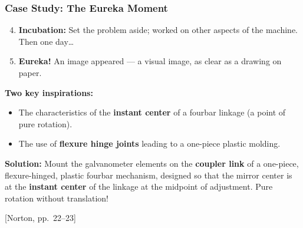 \documentclass[10pt,aspectratio=43]{beamer}
\newcommand{\pref}[1]{\vfill\hfill{\scriptsize\color{gray}[Norton, pp.~#1]}}
\begin{document}
\begin{frame}
\frametitle{Case Study: The Eureka Moment}

\begin{enumerate}
  \setcounter{enumi}{3}
  \item \textbf{Incubation:} Set the problem aside; worked on other aspects of the machine. Then one day\ldots
  \item \textbf{Eureka!} An image appeared --- a visual image, as clear as a drawing on paper.
\end{enumerate}

\vspace{4pt}
\textbf{Two key inspirations:}
\begin{itemize}
  \item The characteristics of the \textbf{instant center} of a fourbar linkage (a point of pure rotation).
  \item The use of \textbf{flexure hinge joints} leading to a one-piece plastic molding.
\end{itemize}

\vspace{6pt}
\begin{yellowbox}
\textbf{Solution:} Mount the galvanometer elements on the \textbf{coupler link} of a one-piece, flexure-hinged, plastic fourbar mechanism, designed so that the mirror center is at the \textbf{instant center} of the linkage at the midpoint of adjustment. Pure rotation without translation!
\end{yellowbox}
\pref{22--23}
\end{frame}
\end{document}

